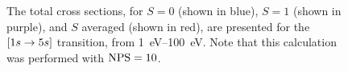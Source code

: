 \documentclass{article}
\begin{document}
\begin{figure}[h]
  \begin{center}
    
  \end{center}
  \caption[Total Cross Sections for $\lrsq{1s \to 5s}$]{
    The total cross sections, for $S = 0$ (shown in blue), $S = 1$ (shown in
    purple), and $S$ averaged (shown in red), are presented for the
    $\lrsq{1s \to 5s}$ transition, from \SIrange{1}{100}{\eV}.
    Note that this calculation was performed with $\rm{NPS} = 10$.
  }
  \label{fig:tcs-5s}
\end{figure}
\end{document}
